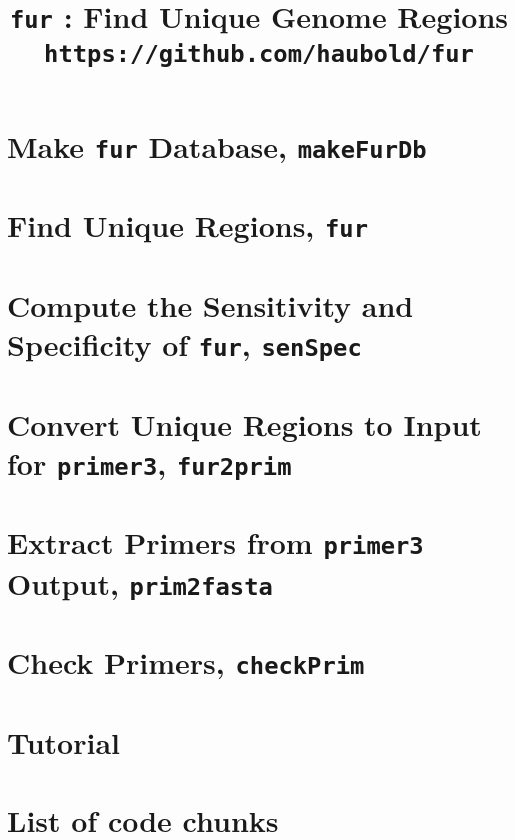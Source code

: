 

\frontmatter
\pagestyle{noweb}

\title{\texttt{fur} : Find Unique Genome
Regions\\\small \texttt{https://github.com/haubold/fur}}
\author{}
\maketitle

\tableofcontents
\listoftheorems[show={tdefn}]
\mainmatter
\chapter{Make \texttt{fur} Database, \texttt{makeFurDb}}\label{ch:makeFurDb}

\chapter{Find Unique Regions, \texttt{fur}}

\chapter{Compute the Sensitivity and Specificity
of \texttt{fur}, \texttt{senSpec}}\label{sec:senSpec}

\chapter{Convert Unique Regions to Input for \texttt{primer3}, \texttt{fur2prim}}

\chapter{Extract Primers from \texttt{primer3}
Output, \texttt{prim2fasta}}

\chapter{Check Primers, \texttt{checkPrim}}

\chapter{Tutorial}


\backmatter
\chapter{List of code chunks}
\nowebchunks



